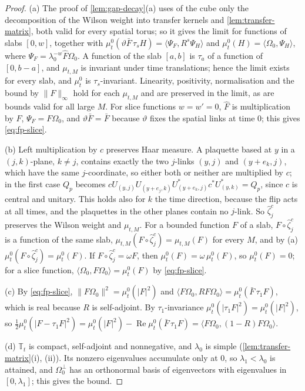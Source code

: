 \documentclass[11pt,a4paper]{amsart}
\theoremstyle{definition}
\theoremstyle{remark}
\numberwithin{equation}{section}
\newcommand{\ip}[2]{\langle #1,#2\rangle}  %
\newcommand{\norm}[1]{\lVert #1\rVert}     %
\newcommand{\abs}[1]{\lvert #1\rvert}      %
\newcommand{\TT}{\mathbb{T}}               %
\newcommand{\lzero}{\lambda_0}             %
\newcommand{\Omegazero}{\Omega_0}          %
\begin{document}
\begin{proof}
(a) The proof of \cref{lem:gap-decay}(a) uses of the cube only the decomposition of the Wilson weight into transfer kernels and \cref{lem:transfer-matrix}, both valid for every spatial torus; so it gives the limit for functions of slabs $[0,w]$, together with $\mu^0_t(\vartheta\bar F\,\tau_sH)=\ip{\Psi_F}{R^s\Psi_H}$ and $\mu^0_t(H)=\ip{\Omegazero}{\Psi_H}$, where $\Psi_F=\lzero^{-w}\hat F\Omegazero$. A function of the slab $[a,b]$ is $\tau_a$ of a function of $[0,b-a]$, and $\mu_{t,M}$ is invariant under time translations; hence the limit exists for every slab, and $\mu^0_t$ is $\tau_s$-invariant. Linearity, positivity, normalisation and the bound by $\norm{F}_\infty$ hold for each $\mu_{t,M}$ and are preserved in the limit, as are bounds valid for all large $M$. For slice functions $w=w'=0$, $\hat F$ is multiplication by $F$, $\Psi_F=F\Omegazero$, and $\vartheta\bar F=\bar F$ because $\vartheta$ fixes the spatial links at time $0$; this gives \eqref{eq:fp-slice}.

(b) Left multiplication by $c$ preserves Haar measure. A plaquette based at $y$ in a $(j,k)$-plane, $k\ne j$, contains exactly the two $j$-links $(y,j)$ and $(y+e_k,j)$, which have the same $j$-coordinate, so either both or neither are multiplied by $c$; in the first case $Q_p$ becomes $cU_{(y,j)}U_{(y+e_j,k)}U^*_{(y+e_k,j)}c^*U^*_{(y,k)}=Q_p$, since $c$ is central and unitary. This holds also for $k$ the time direction, because the flip acts at all times, and the plaquettes in the other planes contain no $j$-link. So $\hat\zeta_j^c$ preserves the Wilson weight and $\mu_{t,M}$. For a bounded function $F$ of a slab, $F\circ\hat\zeta_j^c$ is a function of the same slab, $\mu_{t,M}(F\circ\hat\zeta_j^c)=\mu_{t,M}(F)$ for every $M$, and by (a) $\mu^0_t(F\circ\hat\zeta_j^c)=\mu^0_t(F)$. If $F\circ\hat\zeta_j^c=\omega F$, then $\mu^0_t(F)=\omega\,\mu^0_t(F)$, so $\mu^0_t(F)=0$; for a slice function, $\ip{\Omegazero}{F\Omegazero}=\mu^0_t(F)$ by \eqref{eq:fp-slice}.

(c) By \eqref{eq:fp-slice}, $\norm{F\Omegazero}^2=\mu^0_t(\abs F^2)$ and $\ip{F\Omegazero}{RF\Omegazero}=\mu^0_t(\bar F\,\tau_1F)$, which is real because $R$ is self-adjoint. By $\tau_1$-invariance $\mu^0_t(\abs{\tau_1F}^2)=\mu^0_t(\abs F^2)$, so $\frac12\mu^0_t(\abs{F-\tau_1F}^2)=\mu^0_t(\abs F^2)-\operatorname{Re}\mu^0_t(\bar F\,\tau_1F)=\ip{F\Omegazero}{(1-R)F\Omegazero}$.

(d) $\TT_t$ is compact, self-adjoint and nonnegative, and $\lzero$ is simple (\cref{lem:transfer-matrix}(i), (ii)). Its nonzero eigenvalues accumulate only at $0$, so $\lambda_1<\lzero$ is attained, and $\Omegazero^\perp$ has an orthonormal basis of eigenvectors with eigenvalues in $[0,\lambda_1]$; this gives the bound.
\end{proof}
\end{document}
